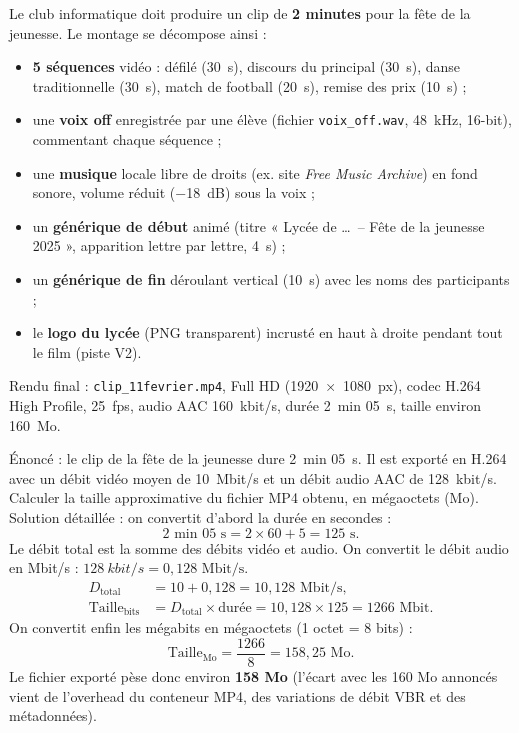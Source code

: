 \documentclass[11pt]{article}
\begin{document}
\begin{exemplebox}
Le club informatique doit produire un clip de \textbf{2 minutes} pour la fête de la jeunesse. Le montage se décompose ainsi :
\begin{itemize}
  \item \textbf{5 séquences} vidéo : défilé (\SI{30}{s}), discours du principal (\SI{30}{s}), danse traditionnelle (\SI{30}{s}), match de football (\SI{20}{s}), remise des prix (\SI{10}{s}) ;
  \item une \textbf{voix off} enregistrée par une élève (fichier \texttt{voix\_off.wav}, \SI{48}{kHz}, 16-bit), commentant chaque séquence ;
  \item une \textbf{musique} locale libre de droits (ex. site \emph{Free Music Archive}) en fond sonore, volume réduit (\SI{-18}{dB}) sous la voix ;
  \item un \textbf{générique de début} animé (titre « Lycée de \dots\ -- Fête de la jeunesse 2025 », apparition lettre par lettre, \SI{4}{s}) ;
  \item un \textbf{générique de fin} déroulant vertical (\SI{10}{s}) avec les noms des participants ;
  \item le \textbf{logo du lycée} (PNG transparent) incrusté en haut à droite pendant tout le film (piste V2).
\end{itemize}
Rendu final : \texttt{clip\_11fevrier.mp4}, Full HD (\SI{1920x1080}{px}), codec H.264 High Profile, \SI{25}{fps}, audio AAC \SI{160}{kbit/s}, durée \SI{2}{min} \SI{05}{s}, taille environ \SI{160}{Mo}.
\end{exemplebox}

\begin{exoresolu}
Énoncé : le clip de la fête de la jeunesse dure \SI{2}{min} \SI{05}{s}. Il est exporté en H.264 avec un débit vidéo moyen de \SI{10}{Mbit/s} et un débit audio AAC de \SI{128}{kbit/s}. Calculer la taille approximative du fichier MP4 obtenu, en mégaoctets (Mo).
\tcblower
Solution détaillée : on convertit d'abord la durée en secondes :
\[ 2 \text{ min } 05 \text{ s} = 2 \times 60 + 5 = 125 \text{ s}. \]
Le débit total est la somme des débits vidéo et audio. On convertit le débit audio en Mbit/s : $\SI{128}{kbit/s} = 0{,}128 \text{ Mbit/s}$.
\begin{align*}
D_{\text{total}} &= 10 + 0{,}128 = 10{,}128 \text{ Mbit/s},\\
\text{Taille}_{\text{bits}} &= D_{\text{total}} \times \text{durée} = 10{,}128 \times 125 = 1266 \text{ Mbit}.
\end{align*}
On convertit enfin les mégabits en mégaoctets (1 octet = 8 bits) :
\[ \text{Taille}_{\text{Mo}} = \frac{1266}{8} = 158{,}25 \text{ Mo}. \]
Le fichier exporté pèse donc environ \textbf{158 Mo} (l'écart avec les 160 Mo annoncés vient de l'overhead du conteneur MP4, des variations de débit VBR et des métadonnées).
\end{exoresolu}
\end{document}
